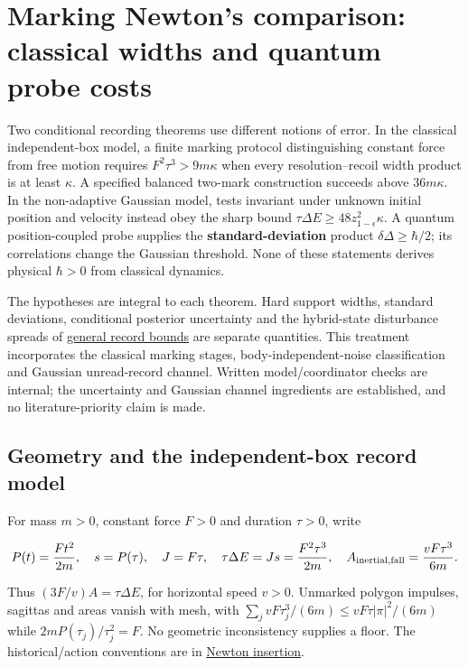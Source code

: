 \documentclass[11pt,a4paper]{article}
\begin{document}
\hypertarget{marking-newtons-comparison-classical-widths-and-quantum-probe-costs}{%
\section{Marking Newton's comparison: classical widths and quantum probe
costs}\label{marking-newtons-comparison-classical-widths-and-quantum-probe-costs}}

Two conditional recording theorems use different notions of error. In
the classical independent-box model, a finite marking protocol
distinguishing constant force from free motion requires
\(F^2\tau^3>9m\kappa\) when every resolution--recoil width product is at
least \(\kappa\). A specified balanced two-mark construction succeeds
above \(36m\kappa\). In the non-adaptive Gaussian model, tests invariant
under unknown initial position and velocity instead obey the sharp bound
\(\tau\Delta E\ge48z_{1-\epsilon}^2\kappa\). A quantum position-coupled
probe supplies the \textbf{standard-deviation} product
\(\delta\Delta\ge\hbar/2\); its correlations change the Gaussian
threshold. None of these statements derives physical \(\hbar>0\) from
classical dynamics.

The hypotheses are integral to each theorem. Hard support widths,
standard deviations, conditional posterior uncertainty and the
hybrid-state disturbance spreads of
\href{record-distance-path-length.md}{general record bounds} are
separate quantities. This treatment incorporates the classical marking
stages, body-independent-noise classification and Gaussian unread-record
channel. Written model/coordinator checks are internal; the uncertainty
and Gaussian channel ingredients are established, and no
literature-priority claim is made.

\hypertarget{geometry-and-the-independent-box-record-model}{%
\subsection{Geometry and the independent-box record
model}\label{geometry-and-the-independent-box-record-model}}

For mass \(m>0\), constant force \(F>0\) and duration \(\tau>0\), write

\[P(t)=\frac{Ft^2}{2m},\quad s=P(\tau),\quad J=F\tau,\quad
\tau\Delta E=Js=\frac{F^2\tau^3}{2m},\quad
A_{\rm inertial,fall}=\frac{vF\tau^3}{6m}.\]

Thus \((3F/v)A=\tau\Delta E\), for horizontal speed \(v>0\). Unmarked
polygon impulses, sagittas and areas vanish with mesh, with
\(\sum_jvF\tau_j^3/(6m)\le vF\tau|\pi|^2/(6m)\) while
\(2mP(\tau_j)/\tau_j^2=F\). No geometric inconsistency supplies a floor.
The historical/action conventions are in
\href{newton-insertion-action.md}{Newton insertion}.
\end{document}
